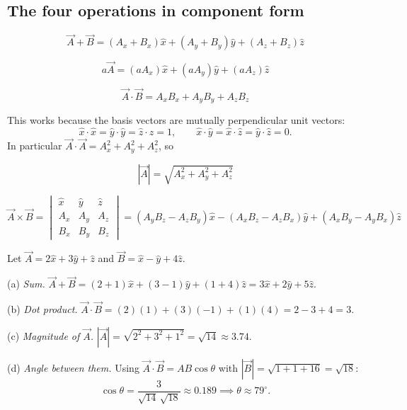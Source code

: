 \subsection{The four operations in component form}

\begin{keybox}
\[
  \vec{A}+\vec{B} = (A_x+B_x)\hat{x} + (A_y+B_y)\hat{y} + (A_z+B_z)\hat{z}
\]
\end{keybox}

\begin{keybox}
\[
  a\vec{A} = (aA_x)\hat{x} + (aA_y)\hat{y} + (aA_z)\hat{z}
\]
\end{keybox}

\begin{keybox}
\[
  \vec{A}\cdot\vec{B} = A_xB_x + A_yB_y + A_zB_z
\]
\end{keybox}

This works because the basis vectors are mutually perpendicular unit vectors:
\[
  \hat{x}\cdot\hat{x}=\hat{y}\cdot\hat{y}=\hat{z}\cdot\hat{z}=1, \qquad
  \hat{x}\cdot\hat{y}=\hat{x}\cdot\hat{z}=\hat{y}\cdot\hat{z}=0.
\]
In particular $\vec{A}\cdot\vec{A}=A_x^2+A_y^2+A_z^2$, so

\begin{keybox}
\[
  |\vec{A}| = \sqrt{A_x^2+A_y^2+A_z^2}
\]
\end{keybox}

\begin{keybox}
\[
  \vec{A}\times\vec{B} = \begin{vmatrix}\hat{x}&\hat{y}&\hat{z}\\A_x&A_y&A_z\\B_x&B_y&B_z\end{vmatrix}
  = (A_yB_z-A_zB_y)\hat{x} - (A_xB_z-A_zB_x)\hat{y} + (A_xB_y-A_yB_x)\hat{z}
\]
\end{keybox}

\begin{workedexample}
Let $\vec{A}=2\hat{x}+3\hat{y}+\hat{z}$ and $\vec{B}=\hat{x}-\hat{y}+4\hat{z}$.

\medskip
(a) \textit{Sum.} $\vec{A}+\vec{B}=(2+1)\hat{x}+(3-1)\hat{y}+(1+4)\hat{z}=3\hat{x}+2\hat{y}+5\hat{z}$.

(b) \textit{Dot product.} $\vec{A}\cdot\vec{B}=(2)(1)+(3)(-1)+(1)(4)=2-3+4=3$.

(c) \textit{Magnitude of $\vec{A}$.} $|\vec{A}|=\sqrt{2^2+3^2+1^2}=\sqrt{14}\approx3.74$.

(d) \textit{Angle between them.} Using $\vec{A}\cdot\vec{B}=AB\cos\theta$ with $|\vec{B}|=\sqrt{1+1+16}=\sqrt{18}$:
\[
  \cos\theta = \frac{3}{\sqrt{14}\,\sqrt{18}} \approx 0.189 \implies \theta \approx 79^\circ.
\]
\end{workedexample}


